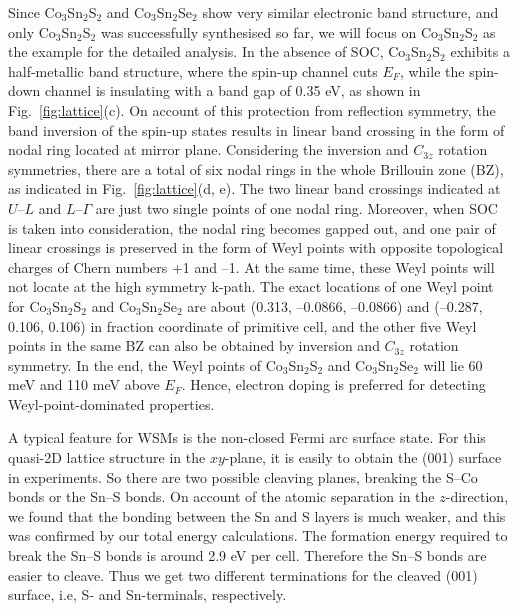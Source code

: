 \documentclass[aps,prb,reprint,superscriptaddress,amssymb,amsmath]{revtex4-1}
\begin{document}
Since Co$_3$Sn$_2$S$_2$ and Co$_3$Sn$_2$Se$_2$ show very similar electronic band structure, and only 
Co$_3$Sn$_2$S$_2$ was successfully synthesised so far, we will focus on Co$_3$Sn$_2$S$_2$ as the example
for the detailed analysis. In the absence of SOC, Co$_3$Sn$_2$S$_2$ exhibits a half-metallic band structure, where the spin-up channel cuts $E_F$, 
while the spin-down channel is insulating with a band gap of 0.35 eV, as shown in Fig.~\ref{fig:lattice}(c). 
On account of this protection from reflection symmetry, 
the band inversion of the spin-up states results in linear band crossing in the form of nodal ring located at mirror plane.
Considering the inversion and $C_{3z}$ rotation symmetries, there are a total of six nodal rings in the whole Brillouin zone (BZ),
as indicated in Fig.~\ref{fig:lattice}(d, e).
The two linear band crossings indicated at $U$--$L$ and $L$--$\Gamma$ are just two single points of one nodal ring. 
Moreover, when SOC is taken into consideration, the nodal ring becomes gapped out, and one pair of linear crossings is preserved in the form 
of Weyl points with opposite topological charges of Chern numbers +1 and --1. 
At the same time, these Weyl points will not locate at the high symmetry k-path. 
The exact locations of one Weyl point for Co$_3$Sn$_2$S$_2$ and Co$_3$Sn$_2$Se$_2$ are about (0.313, --0.0866, --0.0866) and (--0.287, 0.106, 0.106) 
in fraction coordinate of primitive cell, and the other five Weyl points in the same BZ can also be obtained by inversion and $C_{3z}$ rotation symmetry.
In the end, the Weyl points of Co$_3$Sn$_2$S$_2$ and Co$_3$Sn$_2$Se$_2$ will lie 60 meV and 110 meV above $E_F$.
Hence, electron doping is preferred for detecting Weyl-point-dominated properties.

A typical feature for WSMs is the non-closed Fermi arc surface state.
For this quasi-2D lattice structure in the $xy$-plane, it is easily to obtain the (001) surface in experiments. 
So there are two possible cleaving planes, breaking the S--Co bonds or the Sn--S bonds. 
On account of the atomic separation in the $z$-direction, 
we found that the bonding between the Sn and S layers is much weaker, and this was confirmed by our total energy calculations. 
The formation energy required to break the Sn--S bonds is around 2.9 eV per cell.  
Therefore the Sn--S bonds are easier to cleave. 
Thus we get two different terminations for the cleaved (001) surface, i.e, S- and Sn-terminals, respectively.
\end{document}
